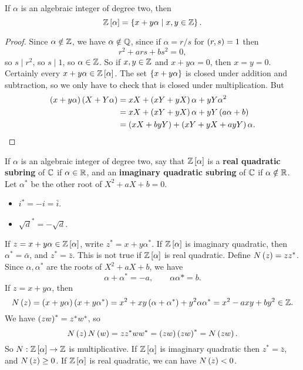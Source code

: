 \begin{proposition}
If $ \alpha $ is an algebraic integer of degree two, then
$$ \mathbb{Z}\left[ \alpha \right] = \left\{ x + y\alpha \mid x, y \in \mathbb{Z} \right\}. $$
\end{proposition}

\begin{proof}
Since $ \alpha \notin \mathbb{Z} $, we have $ \alpha \notin \mathbb{Q} $, since if $ \alpha = r / s $ for $ \left( r, s \right) = 1 $ then
$$ r^2 + ars + bs^2 = 0, $$
so $ s \mid r^2 $, so $ s \mid 1 $, so $ \alpha \in \mathbb{Z} $. So if $ x, y \in \mathbb{Z} $ and $ x + y\alpha = 0 $, then $ x = y = 0 $. Certainly every $ x + y\alpha \in \mathbb{Z}\left[ \alpha \right] $. The set $ \left\{ x + y\alpha \right\} $ is closed under addition and subtraction, so we only have to check that is closed under multiplication. But
\begin{align*}
\left( x + y\alpha \right)\left( X + Y\alpha \right)
& = xX + \left( xY + yX \right)\alpha + yY\alpha^2 \\
& = xX + \left( xY + yX \right)\alpha + yY\left( a\alpha + b \right) \\
& = \left( xX + byY \right) + \left( xY + yX + ayY \right)\alpha.
\end{align*}
\end{proof}

If $ \alpha $ is an algebraic integer of degree two, say that $ \mathbb{Z}\left[ \alpha \right] $ is a \textbf{real quadratic subring} of $ \mathbb{C} $ if $ \alpha \in \mathbb{R} $, and an \textbf{imaginary quadratic subring} of $ \mathbb{C} $ if $ \alpha \notin \mathbb{R} $. Let $ \alpha^* $ be the other root of $ X^2 + aX + b = 0 $.

\begin{example2}
\hfill
\begin{itemize}
\item $ i^* = -i = \bar{i} $.
\item $ \sqrt{d}^* = -\sqrt{d} $.
\end{itemize}
\end{example2}

If $ z = x + y\alpha \in \mathbb{Z}\left[ \alpha \right] $, write $ z^* = x + y\alpha^* $. If $ \mathbb{Z}\left[ \alpha \right] $ is imaginary quadratic, then $ \alpha^* = \bar{\alpha} $, and $ z^* = \bar{z} $. This is not true if $ \mathbb{Z}\left[ \alpha \right] $ is real quadratic. Define $ N\left( z \right) = zz^* $. Since $ \alpha, \alpha^* $ are the roots of $ X^2 + aX + b $, we have
$$ \alpha + \alpha^* = -a, \qquad \alpha\alpha* = b. $$
If $ z = x + y\alpha $, then
$$ N\left( z \right) = \left( x + y\alpha \right)\left( x + y\alpha^* \right) = x^2 + xy\left( \alpha + \alpha^* \right) + y^2\alpha\alpha^* = x^2 - axy + by^2 \in \mathbb{Z}. $$
We have $ \left( zw \right)^* = z^*w^* $, so
$$ N\left( z \right)N\left( w \right) = zz^*ww^* = \left( zw \right)\left( zw \right)^* = N\left( zw \right). $$
So $ N : \mathbb{Z}\left[ \alpha \right] \to \mathbb{Z} $ is multiplicative. If $ \mathbb{Z}\left[ \alpha \right] $ is imaginary quadratic then $ z^* = \bar{z} $, and $ N\left( z \right) \ge 0 $. If $ \mathbb{Z}\left[ \alpha \right] $ is real quadratic, we can have $ N\left( z \right) < 0 $.

